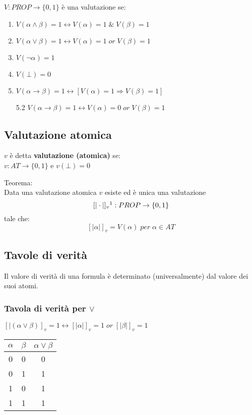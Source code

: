 \documentclass{article}
\theoremstyle{break}
\theoremstyle{break}
\theoremstyle{break}
\theoremstyle{break}
\begin{document}
\( V: PROP \to \{ 0, 1 \} \) è una valutazione se:
\begin{enumerate}
	\item \( V(\alpha \wedge \beta) = 1 \leftrightarrow V(\alpha) = 1\; \&\; V(\beta) = 1 \)
	\item \(V(\alpha \vee \beta) = 1 \leftrightarrow V(\alpha) = 1\; or\; V(\beta) = 1 \)
	\item \( V(\neg \alpha) = 1  \)
	\item \( V(\bot) = 0 \)
	\item \( V(\alpha \to \beta) = 1 \leftrightarrow [ V(\alpha) = 1 \Rightarrow V(\beta) = 1] \)
	\item[5.2] \( V(\alpha \to \beta) = 1 \leftrightarrow V(\alpha) = 0\; or\; V(\beta) = 1  \)
\end{enumerate}

\subsection{Valutazione atomica}
\( v \) è detta \textbf{valutazione (atomica)} se:\\
\( v: AT \to \{0,1\}\) e \(v(\bot) = 0 \)

\begin{definition}
	Teorema:\\
	Data una valutazione atomica \( v \) esiste ed è unica una valutazione
	\[
		[| \cdot |]_v\footnote{\([| \cdot |]\) sono parentesi denotazionali, cioè
			indicano che stiamo valutando il valore della valutazione, quindi della semantica}: PROP \to \{0,1\}
	\] tale che:\[
		[| \alpha |]_v= V(\alpha) \; per\; \alpha \in AT
	\]
\end{definition}

\subsection{Tavole di verità}
Il valore di verità di una formula è determinato (universalmente) dal
valore dei suoi atomi.

\subsubsection{Tavola di verità per \( \vee \) }
\( [|(\alpha \vee \beta)]_v = 1 \leftrightarrow [|\alpha|]_v = 1\; or\; [|\beta|]_v = 1 \)
\begin{center}
	\begin{tabular}{c|c|c}
		\( \alpha \) & \( \beta \) & \( \alpha \vee \beta \) \\
		\hline
		0            & 0           & 0                       \\
		0            & 1           & 1                       \\
		1            & 0           & 1                       \\
		1            & 1           & 1                       \\
	\end{tabular}
\end{center}
\end{document}
